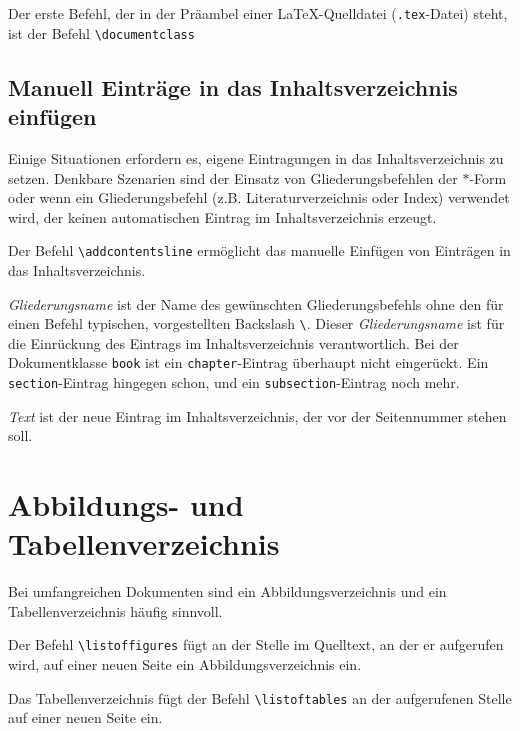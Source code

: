 Der erste Befehl, der in der Präambel einer \LaTeX-Quelldatei (\verb!.tex!-Datei) steht, ist der Befehl \verb!\documentclass!
\begin{document}
\subsection{Manuell Einträge in das Inhaltsverzeichnis einfügen}


Einige Situationen erfordern es, eigene Eintragungen in das Inhaltsverzeichnis 
zu setzen. Denkbare Szenarien sind der 
Einsatz von Gliederungsbefehlen der 
$\ast$-Form oder wenn ein Gliederungsbefehl (z.B. Literaturverzeichnis oder Index) verwendet wird, der keinen automatischen Eintrag im Inhaltsverzeichnis erzeugt. 


Der Befehl \verb!\addcontentsline! ermöglicht das manuelle Einfügen von Einträgen in das Inhaltsverzeichnis.



\textsl{Gliederungsname} ist der 
Name des gewünschten Gliederungsbefehls ohne den für einen Befehl 
typischen, vorgestellten Backslash \verb!\!. 
Dieser \textsl{Gliederungsname} ist 
für die Einrückung des Eintrags im
Inhaltsverzeichnis verantwortlich.
Bei der Dokumentklasse \verb!book! ist ein \verb!chapter!-Eintrag überhaupt 
nicht eingerückt. Ein \verb!section!-Eintrag 
hingegen schon, und ein 
\verb!subsection!-Eintrag noch mehr. 


\textsl{Text} ist der neue Eintrag im
Inhaltsverzeichnis, der vor der Seitennummer 
stehen soll.


\section{Abbildungs- und Tabellenverzeichnis}

Bei umfangreichen Dokumenten sind ein Abbildungsverzeichnis und ein Tabellenverzeichnis häufig sinnvoll. 

Der Befehl \verb!\listoffigures! 
fügt an der Stelle im Quelltext, an der er aufgerufen wird, auf einer neuen Seite ein Abbildungsverzeichnis ein. 


Das Tabellenverzeichnis fügt der Befehl \verb!\listoftables! 
an der aufgerufenen Stelle auf einer neuen Seite ein.
\end{document}
